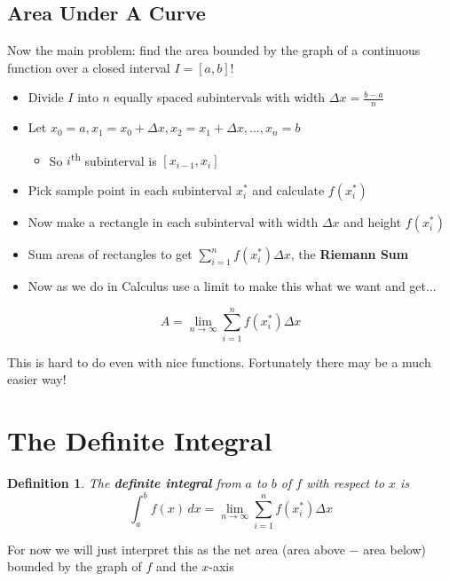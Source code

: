 \documentclass[letterpaper, 11pt, openany]{book}
\theoremstyle{mytheoremstyle}
\newtheorem{definition}{Definition}[section]
\theoremstyle{myexamplestyle}
\begin{document}
\subsection{Area Under A Curve}

Now the main problem: find the area bounded by the graph of a continuous function over a closed interval \(I = [a,b]\)!

\begin{itemize}
    \item Divide \(I\) into \(n\) equally spaced subintervals with width \(\Delta x = \frac{b-a}{n}\)
    \item Let \(x_0 = a, x_1 = x_0 + \Delta x, x_2 = x_1 + \Delta x, \ldots, x_n = b\)
    \begin{itemize}
        \item So \(i\)\textsuperscript{th} subinterval is \([x_{i-1}, x_i]\)
    \end{itemize}
    \item Pick sample point in each subinterval \(x_{i}^{*}\) and calculate \(f(x_{i}^{*})\)
    \item Now make a rectangle in each subinterval with width \(\Delta x \) and height \(f(x_{i}^{*})\)
    \item Sum areas of rectangles to get \(\displaystyle \sum_{i=1}^{n} f(x_{i}^{*}) \Delta x\), the \textbf{Riemann Sum}
    \item Now as we do in Calculus use a limit to make this what we want and get...
\end{itemize}
\[A = \lim_{n\to\infty} \sum_{i=1}^{n} f(x_{i}^{*}) \Delta x \]
\begin{center}
    \Huge \faMeh
\end{center}

This is hard to do even with nice functions. Fortunately there may be a much easier way! \faSmile

\section{The Definite Integral}
\begin{definition}\label{d:definite-integral}
    The \textbf{definite integral} from \(a\) to \(b\) of \(f\) with respect to \(x\) is
    \[\int_a^b f(x) \, dx = \lim_{n\to\infty} \sum_{i=1}^{n} f(x_{i}^{*}) \Delta x\]
\end{definition}

For now we will just interpret this as the net area (area above \(-\) area below) bounded by the graph of \(f\) and the \(x\)-axis
\end{document}
